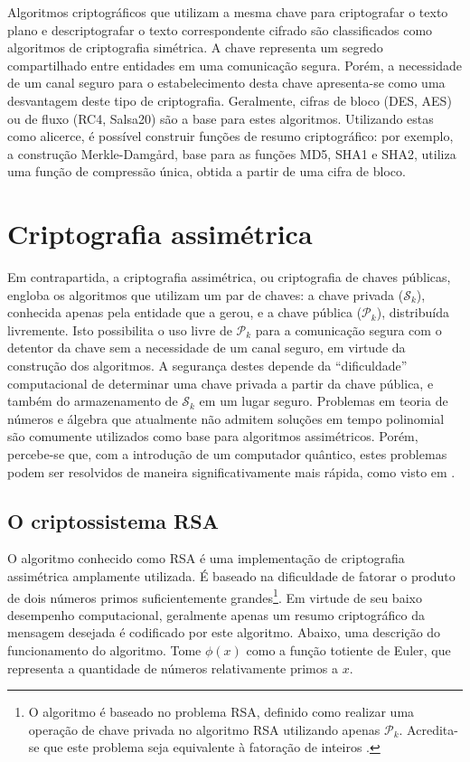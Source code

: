 \documentclass[12pt]{report}
\newcommand{\pk}{$\mathcal{P}_k$}
\newcommand{\sk}{$\mathcal{S}_k$}
\begin{document}
Algoritmos criptográficos que utilizam a mesma chave para criptografar o
texto plano e descriptografar o texto correspondente cifrado são classificados
como algoritmos de criptografia simétrica. A chave representa um segredo
compartilhado entre entidades em uma comunicação segura. Porém, a necessidade
de um canal seguro para o estabelecimento desta chave apresenta-se como uma
desvantagem deste tipo de criptografia. Geralmente, cifras de bloco (DES, AES)
ou de fluxo (RC4, Salsa20) são a base para estes algoritmos. Utilizando estas
como alicerce, é possível construir funções de resumo criptográfico: por
exemplo, a construção Merkle-Damgård, base para as funções MD5, SHA1 e SHA2,
utiliza uma função de compressão única, obtida a partir de uma cifra de bloco.

\section{Criptografia assimétrica}

Em contrapartida, a criptografia assimétrica, ou criptografia de chaves
públicas, engloba os algoritmos que utilizam um par de chaves: a chave privada
(\sk{}), conhecida apenas pela entidade que a gerou, e a chave pública (\pk{}),
distribuída livremente. Isto possibilita o uso livre de \pk{} para a
comunicação segura com o detentor da chave sem a necessidade de um canal
seguro, em virtude da construção dos algoritmos. A segurança destes depende da
``dificuldade'' computacional de determinar uma chave privada a partir da chave
pública, e também do armazenamento de \sk{} em um lugar seguro. Problemas em
teoria de números e álgebra que atualmente não admitem soluções em tempo
polinomial são comumente utilizados como base para algoritmos assimétricos.
Porém, percebe-se que, com a introdução de um computador quântico, estes
problemas podem ser resolvidos de maneira significativamente mais rápida, como
visto em \cite{Shor:1997:PAP:264393.264406}.

\subsection{O criptossistema RSA}

O algoritmo conhecido como RSA \cite{Rivest:1978:MOD:359340.359342} é uma
implementação de criptografia assimétrica amplamente utilizada. É baseado na
dificuldade de fatorar o produto de dois números primos suficientemente
grandes\footnote{O algoritmo é baseado no problema RSA, definido como realizar
uma operação de chave privada no algoritmo RSA utilizando apenas \pk{}.
Acredita-se que este problema seja equivalente à fatoração de inteiros
\cite[3.30]{Menezes:1996:HAC:548089}.}. Em virtude de seu baixo desempenho
computacional, geralmente apenas um resumo criptográfico da mensagem desejada é
codificado por este algoritmo. Abaixo, uma descrição do funcionamento do
algoritmo. Tome $\phi(x)$ como a função totiente de Euler, que representa a
quantidade de números relativamente primos a $x$.
\end{document}
